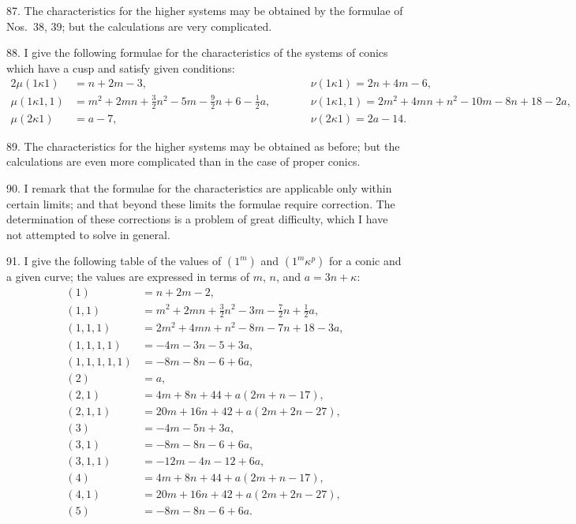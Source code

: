 \documentclass[12pt,a4paper]{article}
\begin{document}
87. The characteristics for the higher systems may be obtained by the formulae of Nos.~38, 39; but the calculations are very complicated.

88. I give the following formulae for the characteristics of the systems of conics which have a cusp and satisfy given conditions:
\begin{alignat*}{2}
\mu(1\kappa 1) &= n + 2m - 3,\qquad &&\nu(1\kappa 1) = 2n + 4m - 6,\\
\mu(1\kappa 1, 1) &= m^2 + 2mn + \tfrac{3}{2}n^2 - 5m - \tfrac{9}{2}n + 6 - \tfrac{1}{2}a,\qquad &&\nu(1\kappa 1, 1) = 2m^2 + 4mn + n^2 - 10m - 8n + 18 - 2a,\\
\mu(2\kappa 1) &= a - 7,\qquad &&\nu(2\kappa 1) = 2a - 14.
\end{alignat*}

89. The characteristics for the higher systems may be obtained as before; but the calculations are even more complicated than in the case of proper conics.

90. I remark that the formulae for the characteristics are applicable only within certain limits; and that beyond these limits the formulae require correction. The determination of these corrections is a problem of great difficulty, which I have not attempted to solve in general.

91. I give the following table of the values of $(1^m)$ and $(1^m \kappa^p)$ for a conic and a given curve; the values are expressed in terms of $m$, $n$, and $a = 3n + \kappa$:
\begin{align*}
(1) &= n + 2m - 2,\\
(1, 1) &= m^2 + 2mn + \tfrac{3}{2}n^2 - 3m - \tfrac{7}{2}n + \tfrac{1}{2}a,\\
(1, 1, 1) &= 2m^2 + 4mn + n^2 - 8m - 7n + 18 - 3a,\\
(1, 1, 1, 1) &= -4m - 3n - 5 + 3a,\\
(1, 1, 1, 1, 1) &= -8m - 8n - 6 + 6a,\\
(2) &= a,\\
(2, 1) &= 4m + 8n + 44 + a(2m + n - 17),\\
(2, 1, 1) &= 20m + 16n + 42 + a(2m + 2n - 27),\\
(3) &= -4m - 5n + 3a,\\
(3, 1) &= -8m - 8n - 6 + 6a,\\
(3, 1, 1) &= -12m - 4n - 12 + 6a,\\
(4) &= 4m + 8n + 44 + a(2m + n - 17),\\
(4, 1) &= 20m + 16n + 42 + a(2m + 2n - 27),\\
(5) &= -8m - 8n - 6 + 6a.
\end{align*}
\end{document}
